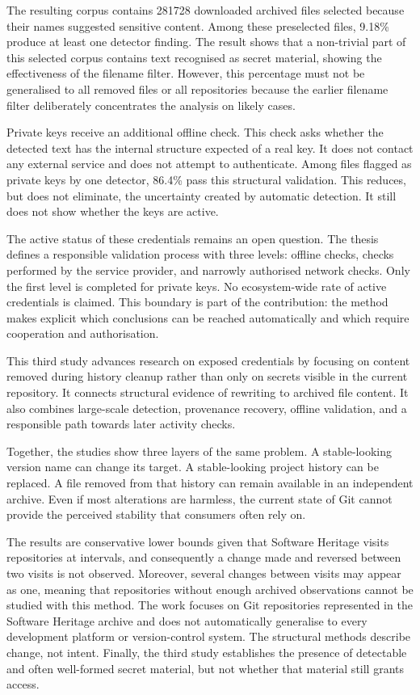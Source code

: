 \begin{SingleSpace}
The resulting corpus contains \num{281728} downloaded archived files selected because their names suggested sensitive content.
Among these preselected files, \num{9.18}\% produce at least one detector finding.
The result shows that a non-trivial part of this selected corpus contains text recognised as secret material, showing the effectiveness of the filename filter.
However, this percentage must not be generalised to all removed files or all repositories because the earlier filename filter deliberately concentrates the analysis on likely cases.

Private keys receive an additional offline check.
This check asks whether the detected text has the internal structure expected of a real key.
It does not contact any external service and does not attempt to authenticate.
Among files flagged as private keys by one detector, \num{86.4}\% pass this structural validation.
This reduces, but does not eliminate, the uncertainty created by automatic detection.
It still does not show whether the keys are active.

The active status of these credentials remains an open question.
The thesis defines a responsible validation process with three levels: offline checks, checks performed by the service provider, and narrowly authorised network checks.
Only the first level is completed for private keys.
No ecosystem-wide rate of active credentials is claimed.
This boundary is part of the contribution: the method makes explicit which conclusions can be reached automatically and which require cooperation and authorisation.

This third study advances research on exposed credentials by focusing on content removed during history cleanup rather than only on secrets visible in the current repository.
It connects structural evidence of rewriting to archived file content.
It also combines large-scale detection, provenance recovery, offline validation, and a responsible path towards later activity checks.

Together, the studies show three layers of the same problem.
A stable-looking version name can change its target.
A stable-looking project history can be replaced.
A file removed from that history can remain available in an independent archive.
Even if most alterations are harmless, the current state of Git cannot provide the perceived stability that consumers often rely on.

The results are conservative lower bounds given that Software Heritage visits repositories at intervals, and consequently a change made and reversed between two visits is not observed.
Moreover, several changes between visits may appear as one, meaning that repositories without enough archived observations cannot be studied with this method.
The work focuses on Git repositories represented in the Software Heritage archive and does not automatically generalise to every development platform or version-control system.
The structural methods describe change, not intent.
Finally, the third study establishes the presence of detectable and often well-formed secret material, but not whether that material still grants access.


\end{SingleSpace}
